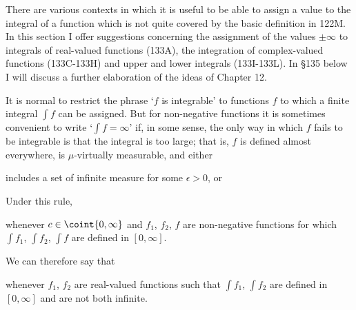       
\def\chaptername{Complements} 
\def\sectionname{Wider concepts of integration} 
      
      
There are various contexts in which it is useful to be able to assign a 
value to the integral of a function which is not quite covered by the 
basic definition in 122M.   In this section I offer suggestions 
concerning the assignment of the values $\pm\infty$ to integrals of 
real-valued functions (133A), the integration 
of complex-valued functions (133C-133H) and upper and lower integrals 
(133I-133L).   In \S135 below I will discuss a further elaboration of 
the ideas of Chapter 12. 
      
 It is normal to restrict the phrase 
`$f$ is integrable' to functions $f$ to which a finite integral 
$\int f$ can 
be assigned.   But for non-negative functions it is 
sometimes convenient to write `$\int f=\infty$' if, in some sense, the 
only way in which $f$ fails to be integrable is that the integral is too 
large;  that is, $f$ is defined almost everywhere, is $\mu$-virtually 
measurable, and either 
      
      
\noindent includes a set of infinite measure for some $\epsilon>0$, or 
      
      
\noindent{}Under this rule,
      
      
\noindent whenever $c\in\coint{0,\infty}$ and $f_1$, $f_2$, $f$ are 
non-negative functions for which $\int f_1$, $\int f_2$, $\int f$ are 
defined in $[0,\infty]$. 
      
We can therefore say that 
      
      
\noindent whenever $f_1$, $f_2$ are real-valued functions such that 
$\int f_1$, $\int f_2$ are defined in $[0,\infty]$ and are not both 
infinite. 
      

